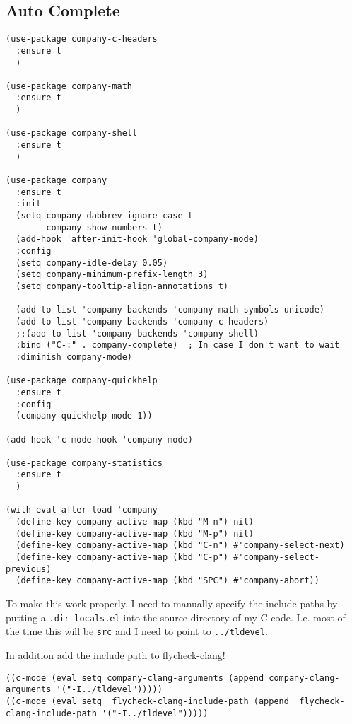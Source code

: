 \documentclass[12pt]{article}
\begin{document}
\subsection{Auto Complete}
\label{sec:org2882157}
\begin{verbatim}
(use-package company-c-headers
  :ensure t
  )

(use-package company-math 
  :ensure t
  )

(use-package company-shell 
  :ensure t
  )

(use-package company
  :ensure t
  :init
  (setq company-dabbrev-ignore-case t
        company-show-numbers t)
  (add-hook 'after-init-hook 'global-company-mode)
  :config
  (setq company-idle-delay 0.05)
  (setq company-minimum-prefix-length 3)
  (setq company-tooltip-align-annotations t)

  (add-to-list 'company-backends 'company-math-symbols-unicode)
  (add-to-list 'company-backends 'company-c-headers)
  ;;(add-to-list 'company-backends 'company-shell)
  :bind ("C-:" . company-complete)  ; In case I don't want to wait
  :diminish company-mode)

(use-package company-quickhelp
  :ensure t
  :config
  (company-quickhelp-mode 1))

(add-hook 'c-mode-hook 'company-mode)

(use-package company-statistics
  :ensure t 
  )

(with-eval-after-load 'company
  (define-key company-active-map (kbd "M-n") nil)
  (define-key company-active-map (kbd "M-p") nil)
  (define-key company-active-map (kbd "C-n") #'company-select-next)
  (define-key company-active-map (kbd "C-p") #'company-select-previous)
  (define-key company-active-map (kbd "SPC") #'company-abort))

\end{verbatim}

To make this work properly, I need to manually specify the include paths by
putting a \texttt{.dir-locals.el} into the source directory of my C code. I.e. most
of the time this will be \texttt{src} and I need to point to
\texttt{../tldevel}. 

In addition add the include path to flycheck-clang! 

\begin{verbatim}
((c-mode (eval setq company-clang-arguments (append company-clang-arguments '("-I../tldevel")))))
((c-mode (eval setq  flycheck-clang-include-path (append  flycheck-clang-include-path '("-I../tldevel")))))      
\end{verbatim}
\end{document}
